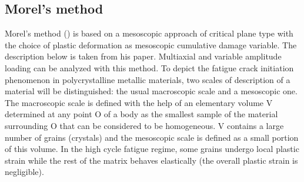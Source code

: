 \subsection{Morel's method}
Morel's method (\cite{Morel2000101}) is based on a mesoscopic approach of critical plane type with the
choice of plastic deformation as mesoscopic cumulative damage variable. The description below is taken from his paper. Multiaxial and variable amplitude loading can be analyzed with this method.
To depict the fatigue crack initiation phenomenon in polycrystalline metallic materials, two scales of description of a material will be distinguished: the usual macroscopic scale and a mesoscopic one. The macroscopic scale is defined with the help of an elementary volume
V determined at any point O of a body as the smallest sample of the material surrounding O that can be considered to be homogeneous. V contains a large number of grains (crystals) and the
mesoscopic scale is defined as a small portion of this
volume. In the high cycle fatigue regime, some grains
undergo local plastic strain while the rest of the matrix
behaves elastically (the overall plastic strain is
negligible).

